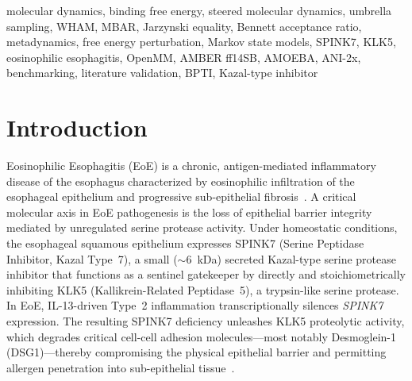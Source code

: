 \documentclass[conference]{IEEEtran}
\begin{document}
\begin{abstract}
structural, dynamic, biophysical, and mutational.  Of the 33 experiments,
9~were executed on CPU: 7~achieved PASS classification (within the 95\%
confidence interval of the literature benchmark) and 2~achieved MARGINAL
classification.  The remaining 24~experiments were classified INCONCLUSIVE:
7~due to the absence of experimentally resolved complex structures in the
PDB, and 17~due to GPU compute requirements (estimated 530--570 NVIDIA
A100 GPU-hours) that exceed current resource availability.  Full
experimental designs, target benchmarks, and GPU execution infrastructure
have been prepared for all INCONCLUSIVE experiments to enable future
completion.
\end{abstract}

\begin{IEEEkeywords}
molecular dynamics, binding free energy, steered molecular dynamics,
umbrella sampling, WHAM, MBAR, Jarzynski equality, Bennett acceptance
ratio, metadynamics, free energy perturbation, Markov state models,
SPINK7, KLK5, eosinophilic esophagitis, OpenMM, AMBER ff14SB, AMOEBA,
ANI-2x, benchmarking, literature validation, BPTI, Kazal-type inhibitor
\end{IEEEkeywords}

\clearpage

\section{Introduction}\label{sec:introduction}

Eosinophilic Esophagitis (EoE) is a chronic, antigen-mediated
inflammatory disease of the esophagus characterized by eosinophilic
infiltration of the esophageal epithelium and progressive sub-epithelial
fibrosis~\cite{rothenberg2009}.  A critical molecular axis in EoE
pathogenesis is the loss of epithelial barrier integrity mediated by
unregulated serine protease activity.  Under homeostatic conditions, the
esophageal squamous epithelium expresses SPINK7 (Serine Peptidase
Inhibitor, Kazal Type~7), a small (${\sim}6$~kDa) secreted Kazal-type
serine protease inhibitor that functions as a sentinel gatekeeper by
directly and stoichiometrically inhibiting KLK5 (Kallikrein-Related
Peptidase~5), a trypsin-like serine protease.  In EoE, IL-13-driven
Type~2 inflammation transcriptionally silences \textit{SPINK7} expression.
The resulting SPINK7 deficiency unleashes KLK5 proteolytic activity, which
degrades critical cell-cell adhesion molecules---most notably Desmoglein-1
(DSG1)---thereby compromising the physical epithelial barrier and
permitting allergen penetration into sub-epithelial tissue~\cite{azouz2018}.
\end{document}
